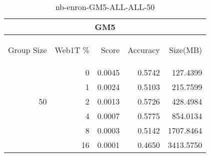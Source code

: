 \begin{center}
\begin{table}[htbp] 
 \begin{center}
\begin{tabular}{ | r | r | r | r | r |}
\hline
\multicolumn{5}{|c|}{GM5}\\
\hline
\begin{sideways}Group Size\end{sideways} & \begin{sideways}Web1T \%\end{sideways} & \begin{sideways}Score\end{sideways} & \begin{sideways}Accuracy\end{sideways} & \begin{sideways}Size(MB)\end{sideways}\\
\hline
\multirow{5}{*}{50}
 & 0 & 0.0045 & 0.5742 & 127.4399\\ \cline{2-5}
 & 1 & 0.0024 & 0.5103 & 215.7599\\ \cline{2-5}
 & 2 & 0.0013 & 0.5726 & 428.4984\\ \cline{2-5}
 & 4 & 0.0007 & 0.5775 & 854.0134\\ \cline{2-5}
 & 8 & 0.0003 & 0.5142 & 1707.8464\\ \cline{2-5}
 & 16 & 0.0001 & 0.4650 & 3413.5750\\ \cline{2-5}
\hline
\end{tabular}
\caption{nb-enron-GM5-ALL-ALL-50}
\label{table:nb-enron-GM5-ALL-ALL-50}
\end{center}
 \end{table}
\end{center}

